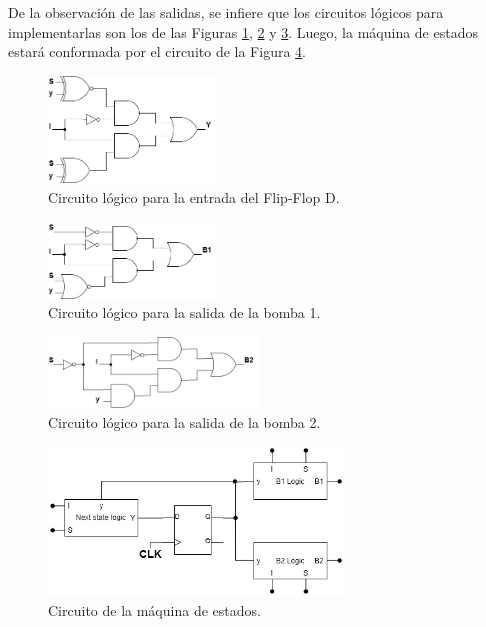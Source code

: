 De la observación de las salidas, se infiere que los circuitos lógicos para implementarlas son los de las Figuras \ref{fig:Y_logic_circuit_ex5}, 
\ref{fig:B1_logic_circuit_ex5} y \ref{fig:B2_logic_circuit_ex5}.
Luego, la máquina de estados estará conformada por el circuito de la Figura \ref{fig:fsm_circtuit_ex5}.
\begin{figure}[H]
    \centering
    \includegraphics[width=0.4\textwidth]{../EJ1/Recursos/Y_logic_circuit.jpg}
    \caption{Circuito lógico para la entrada del Flip-Flop D.}
    \label{fig:Y_logic_circuit_ex5}
\end{figure}
\begin{figure}[H]
    \centering
    \includegraphics[width=0.4\textwidth]{../EJ1/Recursos/B1_logic_circuit.jpg}
    \caption{Circuito lógico para la salida de la bomba 1.}
    \label{fig:B1_logic_circuit_ex5}
\end{figure}
\begin{figure}[H]
    \centering
    \includegraphics[width=0.5\textwidth]{../EJ1/Recursos/B2_logic_circuit.jpg}
    \caption{Circuito lógico para la salida de la bomba 2.}
    \label{fig:B2_logic_circuit_ex5}
\end{figure}
\begin{figure}[H]
    \centering
    \includegraphics[width=0.7\textwidth]{../EJ1/Recursos/fsm_circuit.jpg}
    \caption{Circuito de la máquina de estados.}
    \label{fig:fsm_circtuit_ex5}
\end{figure}



